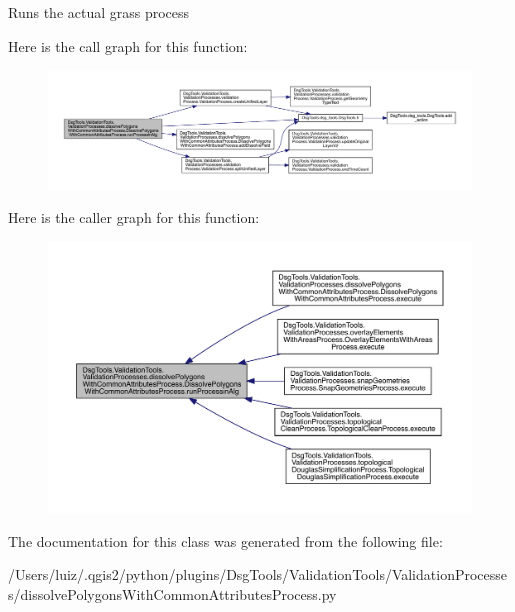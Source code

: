 \begin{DoxyVerb}Runs the actual grass process
\end{DoxyVerb}
 Here is the call graph for this function\+:
\nopagebreak
\begin{figure}[H]
\begin{center}
\leavevmode
\includegraphics[width=350pt]{class_dsg_tools_1_1_validation_tools_1_1_validation_processes_1_1dissolve_polygons_with_common_a230ae60d63e86f39f6dd689e1f92a46f_aba2c4b9d2d29446e1ebdd914c25f38c2_cgraph}
\end{center}
\end{figure}
Here is the caller graph for this function\+:
\nopagebreak
\begin{figure}[H]
\begin{center}
\leavevmode
\includegraphics[width=350pt]{class_dsg_tools_1_1_validation_tools_1_1_validation_processes_1_1dissolve_polygons_with_common_a230ae60d63e86f39f6dd689e1f92a46f_aba2c4b9d2d29446e1ebdd914c25f38c2_icgraph}
\end{center}
\end{figure}


The documentation for this class was generated from the following file\+:\begin{DoxyCompactItemize}
\item 
/\+Users/luiz/.\+qgis2/python/plugins/\+Dsg\+Tools/\+Validation\+Tools/\+Validation\+Processes/dissolve\+Polygons\+With\+Common\+Attributes\+Process.\+py\end{DoxyCompactItemize}
